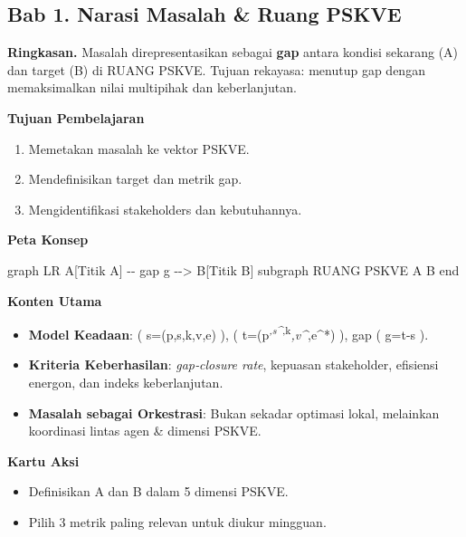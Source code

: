 \documentclass[
  letterpaper,
  DIV=11,
  numbers=noendperiod]{scrartcl}
\newenvironment{Shaded}{\begin{snugshade}}{\end{snugshade}}
\newcommand{\NormalTok}[1]{\textcolor[rgb]{0.00,0.23,0.31}{#1}}
\providecommand{\tightlist}{%
  \setlength{\itemsep}{0pt}\setlength{\parskip}{0pt}}
\begin{document}
\subsection{Bab 1. Narasi Masalah \& Ruang
PSKVE}\label{bab-1.-narasi-masalah-ruang-pskve}

\textbf{Ringkasan.} Masalah direpresentasikan sebagai \textbf{gap}
antara kondisi sekarang (A) dan target (B) di RUANG PSKVE. Tujuan
rekayasa: menutup gap dengan memaksimalkan nilai multipihak dan
keberlanjutan.

\textbf{Tujuan Pembelajaran}

\begin{enumerate}
\def\labelenumi{\arabic{enumi}.}
\tightlist
\item
  Memetakan masalah ke vektor PSKVE.
\item
  Mendefinisikan target dan metrik gap.
\item
  Mengidentifikasi stakeholders dan kebutuhannya.
\end{enumerate}

\textbf{Peta Konsep}

\begin{Shaded}
\begin{Highlighting}[]
\NormalTok{graph LR}
\NormalTok{  A[Titik A] {-}{-} gap g {-}{-}\textgreater{} B[Titik B]}
\NormalTok{  subgraph RUANG PSKVE}
\NormalTok{  A}
\NormalTok{  B}
\NormalTok{  end}
\end{Highlighting}
\end{Shaded}

\textbf{Konten Utama}

\begin{itemize}
\tightlist
\item
  \textbf{Model Keadaan}: ( s=(p,s,k,v,e) ), (
  t=(p\textsuperscript{\emph{,s\^{}},k}\emph{,v\^{}},e\^{}*) ), gap (
  g=t-s ).
\item
  \textbf{Kriteria Keberhasilan}: \emph{gap‑closure rate}, kepuasan
  stakeholder, efisiensi energon, dan indeks keberlanjutan.
\item
  \textbf{Masalah sebagai Orkestrasi}: Bukan sekadar optimasi lokal,
  melainkan koordinasi lintas agen \& dimensi PSKVE.
\end{itemize}

\textbf{Kartu Aksi}

\begin{itemize}
\tightlist
\item
  Definisikan A dan B dalam 5 dimensi PSKVE.
\item
  Pilih 3 metrik paling relevan untuk diukur mingguan.
\end{itemize}
\end{document}
